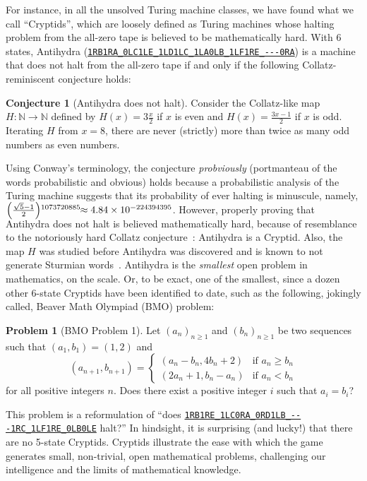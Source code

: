 \documentclass[sigconf,screen]{acmart}
\theoremstyle{definition} %
\newtheorem{conjecture}{Conjecture}[section]
\newtheorem{problem}{Problem}[section]
\numberwithin{equation}{section}
\theoremstyle{definition} %
\newcommand{\tm}[1]{\href{https://bbchallenge.org/#1}{\texttt{\nolinkurl{#1}}}}
\begin{document}
For instance, in all the unsolved Turing machine classes, we have found what we call ``Cryptids'', which are loosely defined as Turing machines whose halting problem from the all-zero tape is believed to be mathematically hard. With 6 states, Antihydra (\tm{1RB1RA\_0LC1LE\_1LD1LC\_1LA0LB\_1LF1RE\_---0RA}) is a machine that does not halt from the all-zero tape if and only if the following Collatz-reminiscent conjecture holds:

\begin{conjecture}[Antihydra does not halt]
    Consider the Collatz-like map $H: \mathbb{N} \to \mathbb{N}$ defined by $H(x) = 3\frac{x}{2}$ if $x$ is even and $H(x) = \frac{3x-1}{2}$ if $x$ is odd. Iterating $H$ from $x=8$, there are never (strictly) more than twice as many odd numbers as even numbers.
\end{conjecture}

Using Conway's terminology, the conjecture \textit{probviously} (portmanteau of the words probabilistic and obvious) holds because a probabilistic analysis of the Turing machine suggests that its probability of ever halting is minuscule, namely, $\smash{\left(\frac{\sqrt{5}-1}{2}\right)}^{1073720885}\!\!\approx 4.84\times 10^{-224394395}$. However, properly proving that Antihydra does not halt is believed mathematically hard, because of resemblance to the notoriously hard Collatz conjecture~\cite{LagariasCollatz}: Antihydra is a Cryptid. Also, the map $H$ was studied before Antihydra was discovered and is known to not generate Sturmian words~\cite{DUBICKAS_2009}. Antihydra is the \textit{smallest} open problem in mathematics, on the \BBfull scale. Or, to be exact, one of the smallest, since a dozen other 6-state Cryptids have been identified to date, such as the following, jokingly called, Beaver Math Olympiad (BMO) problem:

\begin{problem}[BMO Problem 1]
Let $(a_n)_{n \ge 1}$ and $(b_n)_{n \ge 1}$ be two sequences such that $(a_1, b_1) = (1, 2)$ and
$$(a_{n+1}, b_{n+1}) = \begin{cases}
        (a_n-b_n, 4b_n+2) & \text{if }a_n \ge b_n \\
        (2a_n+1, b_n-a_n) & \text{if }a_n < b_n
    \end{cases}$$
\noindent for all positive integers $n$. Does there exist a positive integer $i$ such that $a_i = b_i$?
\end{problem}

This problem is a reformulation of ``does \tm{1RB1RE\_1LC0RA\_0RD1LB\_---1RC\_1LF1RE\_0LB0LE} halt?'' In hindsight, it is surprising (and lucky!) that there are no 5-state Cryptids. Cryptids illustrate the ease with which the \BBfull game generates small, non-trivial, open mathematical problems, challenging our intelligence and the limits of mathematical knowledge. 
\end{document}
